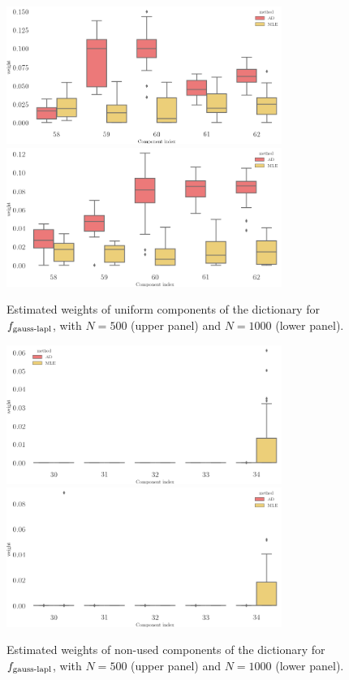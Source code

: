 \begin{figure}
\center
    \includegraphics[width=0.8\textwidth]{./TeX_files/weight_f_gauss_laplace_unif_comp_N_500.png}
    \includegraphics[width=0.8\textwidth]{./TeX_files/weight_f_gauss_laplace_unif_comp_N_1000.png}
    \caption{Estimated weights of uniform components of the dictionary for $f_{\textnormal{gauss-lapl}}$, with $N=500$ (upper panel) and $N=1000$
    (lower panel).}
    \label{fig:weights_gauss_laplace_unif_indexes}
\end{figure}
\begin{figure}
\center
    \includegraphics[width=0.8\textwidth]{./TeX_files/weight_f_gauss_laplace_other_comp_N_500.png}
    \includegraphics[width=0.8\textwidth]{./TeX_files/weight_f_gauss_laplace_other_comp_N_1000.png}
    \caption{Estimated weights of non-used components of the dictionary for $f_{\textnormal{gauss-lapl}}$, with $N=500$ (upper panel) and $N=1000$
    (lower panel).}
    \label{fig:weights_gauss_laplace_other_indexes}
\end{figure}

